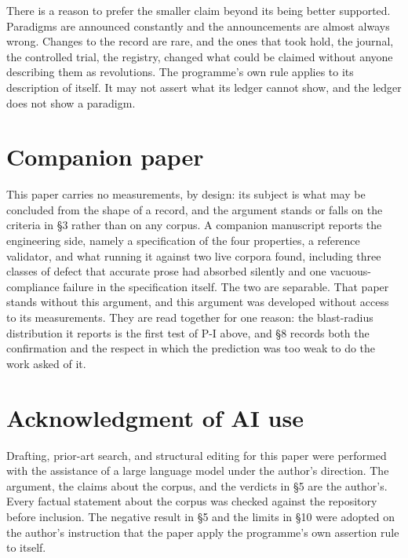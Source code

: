 \documentclass[11pt,letterpaper]{article}
\begin{document}
There is a reason to prefer the smaller claim beyond its being better supported.
Paradigms are announced constantly and the announcements are almost always wrong.
Changes to the record are rare, and the ones that took hold, the journal, the
controlled trial, the registry, changed what could be claimed without anyone
describing them as revolutions. The programme's own rule applies to its
description of itself. It may not assert what its ledger cannot show, and the
ledger does not show a paradigm.

\section*{Companion paper}

This paper carries no measurements, by design: its subject is what may be
concluded from the shape of a record, and the argument stands or falls on the
criteria in \S3 rather than on any corpus. A companion manuscript reports the
engineering side, namely a specification of the four properties, a reference
validator, and what running it against two live corpora found, including three
classes of defect that accurate prose had absorbed silently and one
vacuous-compliance failure in the specification itself. The two are separable.
That paper stands without this argument, and this argument was developed without
access to its measurements. They are read together for one reason: the
blast-radius distribution it reports is the first test of P-I above, and \S8
records both the confirmation and the respect in which the prediction was too
weak to do the work asked of it.

\section*{Acknowledgment of AI use}

Drafting, prior-art search, and structural editing for this paper were performed
with the assistance of a large language model under the author's direction. The
argument, the claims about the corpus, and the verdicts in \S5 are the author's.
Every factual statement about the corpus was checked against the repository
before inclusion. The negative result in \S5 and the limits in \S10 were adopted
on the author's instruction that the paper apply the programme's own assertion
rule to itself.
\end{document}
